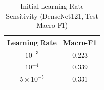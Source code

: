 \begin{table}[t]
\caption{Initial Learning Rate Sensitivity (DenseNet121, Test Macro-F1)}
\label{tab:lr}
\centering
\begin{tabular}{cc}
\toprule
Learning Rate & Macro-F1 \\
\midrule
$10^{-3}$ & 0.223 \\
$10^{-4}$ & 0.339 \\
$5\times10^{-5}$ & 0.331 \\
\bottomrule
\end{tabular}
\end{table}
